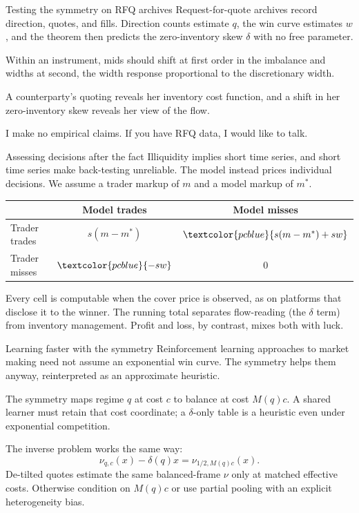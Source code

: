 \documentclass[10pt]{beamer}
\newcommand{\blue}[1]{\textcolor{pcblue}{#1}}
\begin{document}
\begin{frame}{Testing the symmetry on RFQ archives}
Request-for-quote archives record direction, quotes, and fills. Direction counts estimate $q$, the win curve estimates $w$, and the theorem then predicts the zero-inventory skew $\delta$ with no free parameter.
\vspace{1em}

Within an instrument, mids should shift at first order in the imbalance and widths at second, the width response proportional to the discretionary width.
\vspace{1em}

A counterparty's quoting reveals her inventory cost function, and a shift in her zero-inventory skew reveals her view of the flow.
\vspace{1em}

I make no empirical claims. If you have RFQ data, I would like to talk.
\end{frame}

\begin{frame}{Assessing decisions after the fact}
Illiquidity implies short time series, and short time series make back-testing unreliable. The model instead prices individual decisions. We assume a trader markup of $m$ and a model markup of $m^*$.
\begin{center}
\begin{tabular}{|l|c|c|}
\hline
 & Model trades & Model misses \\
\hline
Trader trades & $s(m - m^*)$ & $\blue{s(m-m^*) + sw}$ \\
Trader misses & $\blue{-sw}$ & $0$ \\
\hline
\end{tabular}
\end{center}
\vspace{0.5em}
Every cell is computable when the cover price is observed, as on platforms that disclose it to the winner. The running total separates flow-reading (the $\delta$ term) from inventory management. Profit and loss, by contrast, mixes both with luck.
\end{frame}

\begin{frame}{Learning faster with the symmetry}
Reinforcement learning approaches to market making need not assume an exponential win curve. The symmetry helps them anyway, reinterpreted as an approximate heuristic.
\vspace{1em}

The symmetry maps regime $q$ at cost $c$ to balance at cost $M(q)c$. A shared learner must retain that cost coordinate; a $\delta$-only table is a heuristic even under exponential competition.
\vspace{1em}

The inverse problem works the same way:
\[
\nu_{q,c}(x)-\delta(q)x = \nu_{1/2,M(q)c}(x).
\]
De-tilted quotes estimate the same balanced-frame $\nu$ only at matched effective costs. Otherwise condition on $M(q)c$ or use partial pooling with an explicit heterogeneity bias.
\end{frame}
\end{document}
